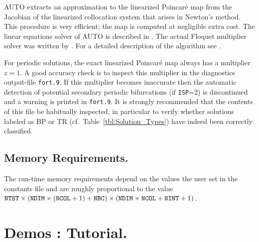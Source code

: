 \documentclass[12pt]{report}
\begin{document}
{\cal AUTO} extracts an approximation to the linearized Poincar\'e map from 
the Jacobian of the linearized collocation system that arises in Newton's method.
This procedure is very efficient; the map is computed at negligible extra cost.
The linear equations solver of {\cal AUTO} is described in 
 \citeyear{DoKeKe:91b}.
The actual Floquet multiplier solver was written by
 \citeyear{Fa:94}.
For a detailed description of the algorithm see 
 \citeyear{FaJe:91}.

For periodic solutions, the exact linearized Poincar\'e map always has 
a multiplier $z=1$.
A good accuracy check is to inspect this 
multiplier in the diagnostics output-file {\tt fort.9}.
If this multiplier becomes inaccurate then the automatic detection 
of potential secondary periodic bifurcations (if {\tt ISP}=2) is discontinued 
and a warning is printed in {\tt fort.9}.
It is strongly recommended that the contents of this file be
habitually inspected,
in particular to verify whether solutions labeled as BP or TR 
(cf.~Table~\ref{tbl:Solution_Types}) have indeed  been correctly classified.
 
\section{ Memory Requirements.} \label{sec:Memory_requirements}
The run-time memory requirements depend on the values the user set in
the constants file and are roughly proportional to the value
${\tt NTST}\times({\tt NDIM}\times({\tt NCOL}+1)+{\tt NBC})\times
({\tt NDIM}\times{\tt NCOL}+{\tt NINT}+1)$.

\chapter{ \AUTO Demos : Tutorial.} \label{ch:Demos:_Tutorial}
\newpage
\end{document}
